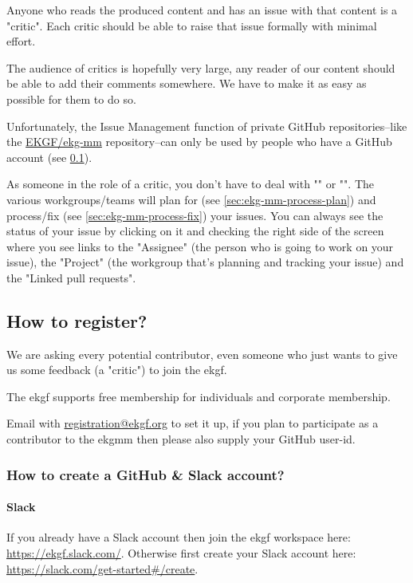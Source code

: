 Anyone who reads the produced content and has an issue with that content is a "critic".
Each critic should be able to raise that issue formally with minimal effort.

The audience of critics is hopefully very large, any reader of our content should
be able to add their comments somewhere.
We have to make it as easy as possible for them to do so. 

Unfortunately, the Issue Management function of private GitHub repositories--like
the \href{https://github.com/ekgf/ekg-mm}{EKGF/ekg-mm} repository--can only be
used by people who have a GitHub account (see \ref{subsec:ekg-mm-process-how-to-register}).

As someone in the role of a critic, you don’t have to deal with ""
or "". 
The various workgroups/teams will plan for (see \ref{sec:ekg-mm-process-plan})
and process/fix (see \ref{sec:ekg-mm-process-fix}) your issues. 
You can always see the status of your issue by clicking on it and checking 
the right side of the screen where you see links to the "Assignee"
(the person who is going to work on your issue), the "Project"
(the workgroup that’s planning and tracking your issue) and the "Linked pull requests". 

\subsection{How to register?}
\label{subsec:ekg-mm-process-how-to-register}

We are asking every potential contributor, even someone who just wants to give us
some feedback (a "critic") to join the \gls{ekgf}.

The \gls{ekgf} supports free membership for individuals and corporate membership.

Email with \href{mailto:registration@ekgf.org}{registration@ekgf.org} to set it up,
if you plan to participate as a contributor to the \gls{ekgmm} then please also
supply your GitHub user-id.

\subsubsection{How to create a GitHub \& Slack account?}

\paragraph{Slack}

If you already have a Slack account then join the \gls{ekgf} workspace here: \url{https://ekgf.slack.com/}.
Otherwise first create your Slack account here: \url{https://slack.com/get-started\#/create}.

